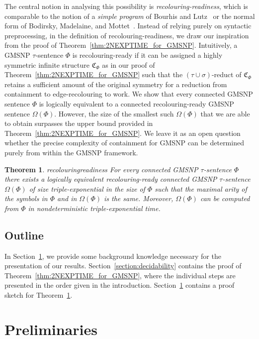 \documentclass[oneside,reqno,12pt]{amsart}
\theoremstyle{plain}
\newtheorem{theorem}[thm]{Theorem}
\theoremstyle{remark}
\newcommand{\struct}[1]{\mathfrak{#1}}
\begin{document}
{The central notion in analysing this possibility is \emph{recolouring-readiness}, which is comparable to the notion of a \emph{simple program} of Bourhis and Lutz~\cite{bouhris_lutz2016} or the normal form of Bodirsky, Madelaine, and Mottet~\cite{bodirsky2018_article}.
Instead of relying purely on syntactic preprocessing, in the definition of recolouring-readiness, we draw our inspiration from the proof of Theorem~\ref{thm:2NEXPTIME_for_GMSNP}.
Intuitively, a GMSNP $\tau$-sentence $\Phi$ is recolouring-ready if it can be assigned 
a highly symmetric infinite structure $\struct{C}_{\Phi}$ as in our proof of Theorem~\ref{thm:2NEXPTIME_for_GMSNP} such that the $(\tau\cup \sigma)$-reduct of $\struct{C}_{\Phi}$ retains a sufficient amount of the original symmetry for a reduction from containment to edge-recolouring to work.
We show that every connected GMSNP sentence $\Phi$ is logically equivalent to a connected recolouring-ready GMSNP sentence $\Omega(\Phi)$.
However, the size of the smallest such $\Omega(\Phi)$ that we are able to obtain surpasses the upper bound provided in Theorem~\ref{thm:2NEXPTIME_for_GMSNP}.
We leave it as an open question whether the precise complexity of containment for GMSNP can be determined purely from within the GMSNP framework.


\begin{theorem}{recolouringreadiness}    \label{thm:recolouring_readiness}  
For every connected GMSNP $\tau$-sentence $\Phi$ there exists a logically equivalent recolouring-ready connected 
 GMSNP $\tau$-sentence $\Omega(\Phi)$ of size triple-exponential in the size of $\Phi$ such that the maximal arity of the symbols in $\Phi$ and in $\Omega(\Phi)$ is the same. 
Moreover, $\Omega(\Phi)$ can be computed from $\Phi$ in nondeterministic triple-exponential time.
\end{theorem} 
  
\subsection{Outline}
In Section~\ref{section:preliminaries}, we provide some background knowledge necessary for the presentation of our results.
Section~\ref{section:decidability} contains the proof of Theorem~\ref{thm:2NEXPTIME_for_GMSNP}, where the individual steps are presented in the order given in the introduction.
Section~\ref{thm:recolouring_readiness} contains a proof sketch for Theorem~\ref{thm:recolouring_readiness}. 
  


\section{Preliminaries}\label{section:preliminaries}
  
}
\end{document}
